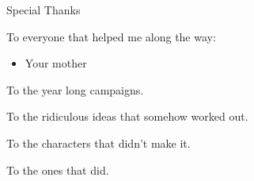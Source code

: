 \documentclass[../main.tex]{subfiles}
\begin{document}
    {\LARGE Special Thanks}
    
    To everyone that helped me along the way:
    \begin{itemize}
        \item Your mother
    \end{itemize}

    To the year long campaigns.

    To the ridiculous ideas that somehow worked out.

    To the characters that didn't make it.

    To the ones that did.
\end{document}
